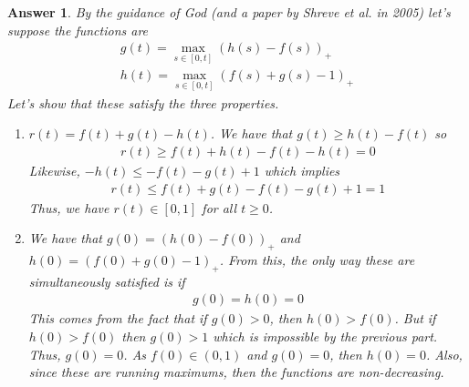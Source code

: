 \documentclass[12pt]{article}
\theoremstyle{colon}
\newtheorem*{answer}{Answer}
\begin{document}
\begin{answer}
  By the guidance of God (and a paper by Shreve et al. in 2005) let's suppose the functions are
  \begin{gather*}
    g(t) = \max_{s \in [0,t]} (h(s) - f(s))_+ \\
    h(t) = \max_{s \in [0,t]} (f(s) + g(s) - 1)_+
  \end{gather*}
  Let's show that these satisfy the three properties.
  \begin{enumerate}[label=\roman*)]
    \item $r(t) = f(t) + g(t) - h(t)$. We have that $g(t) \geq h(t) - f(t)$ so
      \begin{gather*}
        r(t) \geq f(t) + h(t) - f(t) - h(t) = 0
      \end{gather*}
      Likewise, $-h(t) \leq - f(t) - g(t) + 1$ which implies
      \begin{gather*}
        r(t) \leq f(t) + g(t) - f(t) - g(t) + 1 = 1
      \end{gather*}
      Thus, we have $r(t) \in [0,1]$ for all $t \geq 0$.

    \item We have that $g(0) = (h(0) - f(0))_+$ and $h(0) = (f(0)+g(0)-1)_+$. From this, the only way these are simultaneously satisfied is if
      \begin{gather*}
        g(0) = h(0) = 0
      \end{gather*}
      This comes from the fact that if $g(0) > 0$, then $h(0) > f(0)$. But if $h(0) > f(0)$ then $g(0) > 1$ which is impossible by the previous part. Thus, $g(0) = 0$. As $f(0) \in (0,1)$ and $g(0) = 0$, then $h(0) = 0$. Also, since these are running maximums, then the functions are non-decreasing.


\end{enumerate}
\end{answer}
\end{document}

